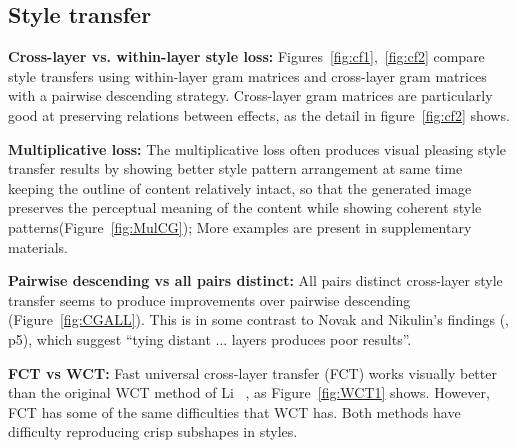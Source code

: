 \documentclass[runningheads]{llncs}
\begin{document}
\subsection{Style transfer}\label{sec:mul}

{\bf Cross-layer vs. within-layer style loss:}  Figures~\ref{fig:cf1},~\ref{fig:cf2} compare style transfers using within-layer gram matrices
and cross-layer gram matrices with a pairwise descending strategy. Cross-layer gram matrices are particularly good at
preserving relations between effects, as the detail in figure~\ref{fig:cf2} shows.


{\bf Multiplicative loss:} The multiplicative loss often produces visual pleasing style transfer results by showing better style pattern arrangement at same time keeping the outline of content relatively intact, so that the generated image preserves the perceptual meaning of the content while showing coherent style patterns(Figure~\ref{fig:MulCG}); More examples are present in supplementary materials.  

{\bf Pairwise descending vs all pairs distinct:}  All pairs distinct cross-layer style transfer seems to produce
improvements over pairwise descending (Figure~\ref{fig:CGALL}).  This is in some contrast to Novak and Nikulin's findings
(\cite{novak2016improving}, p5), which suggest ``tying distant ... layers produces poor results''.  

{\bf FCT vs WCT:}  Fast universal cross-layer transfer (FCT) works visually better than the original WCT method of Li \ea ~\cite{UST}, as Figure~\ref{fig:WCT1} shows.  However, FCT has some of the same difficulties that WCT has.  Both methods have
difficulty reproducing crisp subshapes in styles. 
\end{document}
